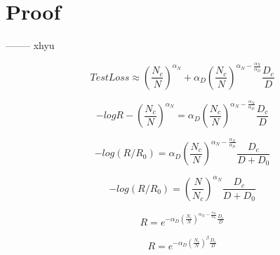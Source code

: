 \section{Proof}


-------- xhyu

\begin{equation}
TestLoss \approx \left(\frac{N_c}{N}\right)^{\alpha_N}
+ \alpha_D \left(\frac{N_c}{N}\right)^{\alpha_N-\frac{\alpha_N}{\alpha_D}} \frac{D_c}{D}
\end{equation}

\begin{equation}
    -logR - \left(\frac{N_c}{N}\right)^{\alpha_N} = \alpha_D \left(\frac{N_c}{N}\right)^{\alpha_N-\frac{\alpha_N}{\alpha_D}} \frac{D_c}{D}
\end{equation}


\begin{equation}
    -log(R/R_0) = \alpha_D \left(\frac{N_c}{N}\right)^{\alpha_N-\frac{\alpha_N}{\alpha_D}} \frac{D_c}{D+D_0}
\end{equation}


\begin{equation}
    -log(R/R_0) = \left(\frac{N}{N_c}\right)^{\alpha_N} \frac{D_c}{D+D_0}
\end{equation}

\begin{equation}
    R = e^{-\alpha_D \left(\frac{N_c}{N}\right)^{\alpha_N-\frac{\alpha_N}{\alpha_D}} \frac{D_c}{D}}
\end{equation}


\begin{equation}
    R = e^{-\alpha_D \left(\frac{N_c}{N}\right)^{\beta} \frac{D_c}{D}}
\end{equation}